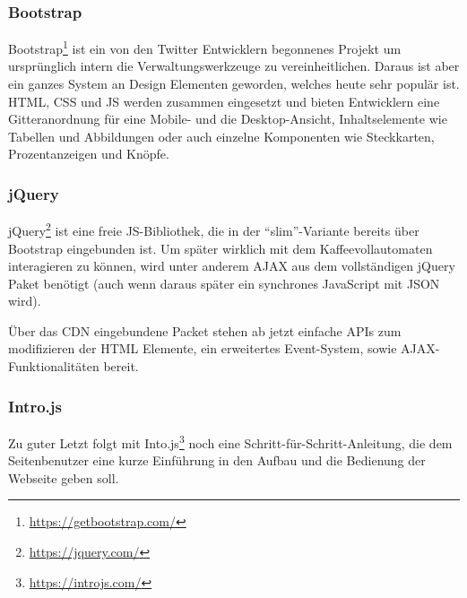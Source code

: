 \subsubsection{Bootstrap}
Bootstrap\footnote{\url{https://getbootstrap.com/}} ist ein von den Twitter Entwicklern begonnenes Projekt um ursprünglich intern die Verwaltungswerkzeuge zu vereinheitlichen.
Daraus ist aber ein ganzes System an Design Elementen geworden, welches heute sehr populär ist.
\ac{HTML}, \ac{CSS} und \ac{JS} werden zusammen eingesetzt und bieten Entwicklern eine Gitteranordnung für eine Mobile- und die Desktop-Ansicht, Inhaltselemente wie Tabellen und Abbildungen oder auch einzelne Komponenten wie Steckkarten, Prozentanzeigen und Knöpfe.

\subsubsection{jQuery}
jQuery\footnote{\url{https://jquery.com/}} ist eine freie \acl{JS}-Bibliothek, die in der "`slim"'-Variante bereits über Bootstrap eingebunden ist.
Um später wirklich mit dem Kaffeevollautomaten interagieren zu können, wird unter anderem \acs{AJAX} aus dem vollständigen jQuery Paket benötigt (auch wenn daraus später ein synchrones JavaScript mit \acs{JSON} wird).

Über das \acs{CDN} eingebundene Packet stehen ab jetzt einfache \aclp{API} zum modifizieren der \acs{HTML} Elemente, ein erweitertes Event-System, sowie \acs{AJAX}-Funktionalitäten bereit.

\subsubsection{Intro.js}
Zu guter Letzt folgt mit Into.js\footnote{\url{https://introjs.com/}} noch eine Schritt-für-Schritt-Anleitung, die dem Seitenbenutzer eine kurze Einführung in den Aufbau und die Bedienung der Webseite geben soll.
